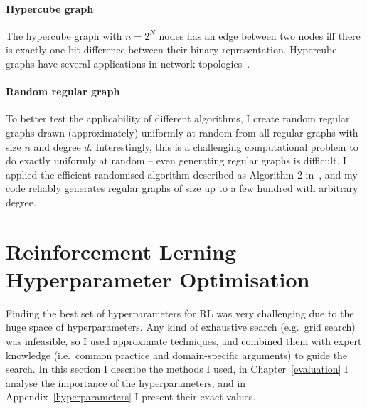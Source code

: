 \paragraph{Hypercube graph} The hypercube graph with $n=2^N$ nodes has an edge between two nodes iff there is exactly one bit difference between their binary representation. Hypercube graphs have several applications in network topologies~\cite{ostrouchov1987hypercubenetwork}.


\paragraph{Random regular graph} To better test the applicability of different algorithms, I create random regular graphs drawn (approximately) uniformly at random from all regular graphs with size $n$ and degree $d$. Interestingly, this is a challenging computational problem to do exactly uniformly at random -- even generating regular graphs is difficult. I applied the efficient randomised algorithm described as Algorithm 2 in~\cite{steger1999randomregulargraphs}, and my code reliably generates regular graphs of size up to a few hundred with arbitrary degree.


\section{Reinforcement Lerning Hyperparameter Optimisation}

Finding the best set of hyperparameters for RL was very challenging due to the huge space of hyperparameters. Any kind of exhaustive search (e.g.\ grid search) was infeasible, so I used approximate techniques, and combined them with expert knowledge (i.e.\ common practice and domain-specific arguments) to guide the search.
In this section I describe the methods I used, in Chapter~\ref{evaluation} I analyse the importance of the hyperparameters, and in Appendix~\ref{hyperparameters} I present their exact values.


